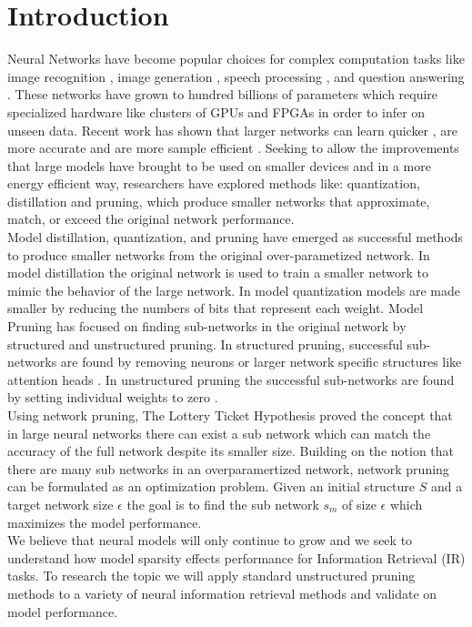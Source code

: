 \documentclass[sigplan,screen]{acmart}
\begin{document}
\section{Introduction}
Neural Networks have become popular choices for complex computation tasks like image recognition \cite{Howard2017MobileNetsEC}, image generation \cite{Goodfellow2014GenerativeAN}, speech processing \cite{Zhao2017RecurrentCN}, and question answering \cite{Seo2017BidirectionalAF}. These networks have grown to hundred billions of parameters \cite{Brown2020LanguageMA} which require specialized hardware like clusters of GPUs and FPGAs in order to infer on unseen data. Recent work has shown that larger networks can learn quicker \cite{Li2020TrainLT}, are more accurate and are more sample efficient \cite{Kaplan2020ScalingLF}. Seeking to allow the improvements that large models have brought to be used on smaller devices and in a more energy efficient way, researchers have explored methods like: quantization, distillation and pruning, which produce smaller networks that approximate, match, or exceed the original network performance. \\ 
Model distillation, quantization, and pruning have emerged as successful methods to produce smaller networks from the original over-parametized network. In model distillation \cite{Ba2014DoDN} the original network is used to train a smaller network to mimic the behavior of the large network. In model quantization \cite{Han2016DeepCC} models are made smaller by  reducing the numbers of bits that represent each weight. Model Pruning \cite{LeCun1989OptimalBD} has focused on finding sub-networks in the original network by structured and unstructured pruning. In structured pruning, successful sub-networks are found by removing neurons  \cite{Wang2019StructuredPF} or larger network specific structures like attention heads \cite{Voita2019AnalyzingMS}. In unstructured pruning the successful sub-networks are found by setting individual weights to zero \cite{Kwon2019StructuredCB}. \\
Using network pruning, The Lottery Ticket Hypothesis \cite{Frankle2019TheLT} proved the concept that in large neural networks there can exist a sub network which can match the accuracy of the full network despite its smaller size. Building on the notion that there are many sub networks in an overparamertized network, network pruning  can be formulated as an optimization problem. Given an initial structure $S$ and a target network size $\epsilon$ the goal is to find the sub network $s_m$ of size $\epsilon$ which maximizes the model performance. \\
We believe that neural models will only continue to grow and we seek to understand how model sparsity effects performance for Information Retrieval (IR) tasks. To research the topic we will apply standard unstructured pruning methods to a variety of neural information retrieval methods and validate on model performance. 
\end{document}
